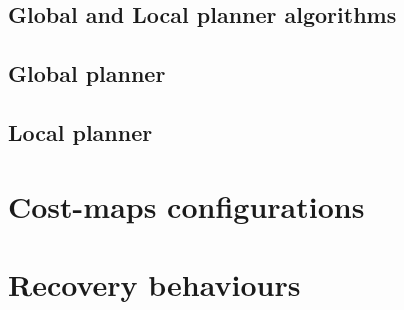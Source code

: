 \subsection{Global and Local planner algorithms}

\subsection*{Global planner}
\subsection*{Local planner}
\section{Cost-maps configurations}
\section{Recovery behaviours}

